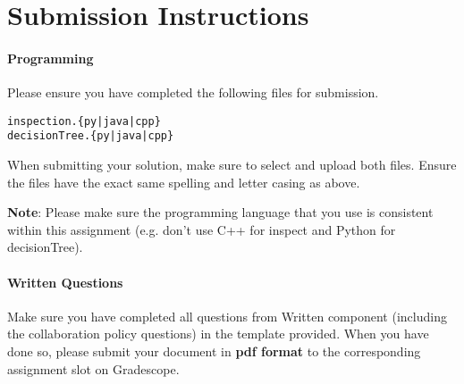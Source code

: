 \documentclass[11pt,addpoints,answers]{exam}
\begin{document}
\section{Submission Instructions}

\paragraph{Programming}
Please ensure you have completed the following files for submission.


\begin{verbatim}
inspection.{py|java|cpp}
decisionTree.{py|java|cpp}
\end{verbatim}

When submitting your solution, make sure to select and upload both files. Ensure the files have the exact same spelling and letter casing as above.


\textbf{Note}: Please make sure the programming language that you use is consistent within this assignment (e.g. don't use C++ for inspect and Python for decisionTree).

\paragraph{Written Questions}
Make sure you have completed all questions from Written component (including the collaboration policy questions) in the template provided.  When you have done so, please submit your document in \textbf{pdf format} to the corresponding assignment slot on Gradescope.



\newpage
\end{document}
